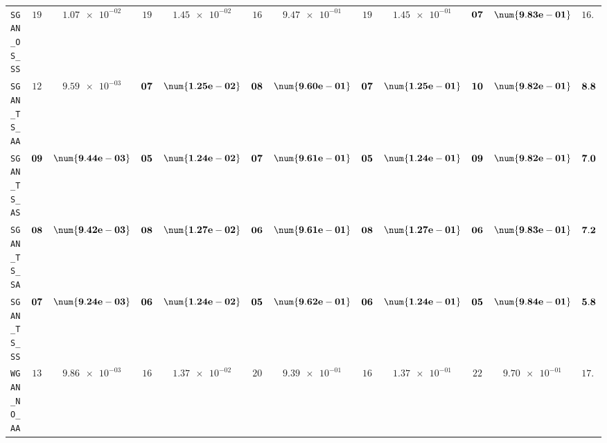 \begin{xltabular}{\textwidth}{l||cC|cC|cC|cC|cC||c}
	\texttt{SGAN\_OS\_SS} & $ 19$ & $ \num{1.07e-02}$ & $ 19$ & $ \num{1.45e-02}$ & $ 16$ & $ \num{9.47e-01}$ & $ 19$ & $ \num{1.45e-01}$ & $\bf 07$ & $\bf \num{9.83e-01}$ & $ 16.0$  \\
	\texttt{SGAN\_TS\_AA} & $ 12$ & $ \num{9.59e-03}$ & $\bf 07$ & $\bf \num{1.25e-02}$ & $\bf 08$ & $\bf \num{9.60e-01}$ & $\bf 07$ & $\bf \num{1.25e-01}$ & $\bf 10$ & $\bf \num{9.82e-01}$ & $\bf 8.8$  \\
	\texttt{SGAN\_TS\_AS} & $\bf 09$ & $\bf \num{9.44e-03}$ & $\bf 05$ & $\bf \num{1.24e-02}$ & $\bf 07$ & $\bf \num{9.61e-01}$ & $\bf 05$ & $\bf \num{1.24e-01}$ & $\bf 09$ & $\bf \num{9.82e-01}$ & $\bf 7.0$  \\
	\texttt{SGAN\_TS\_SA} & $\bf 08$ & $\bf \num{9.42e-03}$ & $\bf 08$ & $\bf \num{1.27e-02}$ & $\bf 06$ & $\bf \num{9.61e-01}$ & $\bf 08$ & $\bf \num{1.27e-01}$ & $\bf 06$ & $\bf \num{9.83e-01}$ & $\bf 7.2$  \\
	\texttt{SGAN\_TS\_SS} & $\bf 07$ & $\bf \num{9.24e-03}$ & $\bf 06$ & $\bf \num{1.24e-02}$ & $\bf 05$ & $\bf \num{9.62e-01}$ & $\bf 06$ & $\bf \num{1.24e-01}$ & $\bf 05$ & $\bf \num{9.84e-01}$ & $\bf 5.8$  \\ \midrule
	\texttt{WGAN\_NO\_AA} & $ 13$ & $ \num{9.86e-03}$ & $ 16$ & $ \num{1.37e-02}$ & $ 20$ & $ \num{9.39e-01}$ & $ 16$ & $ \num{1.37e-01}$ & $ 22$ & $ \num{9.70e-01}$ & $ 17.4$  \\

\end{xltabular}
